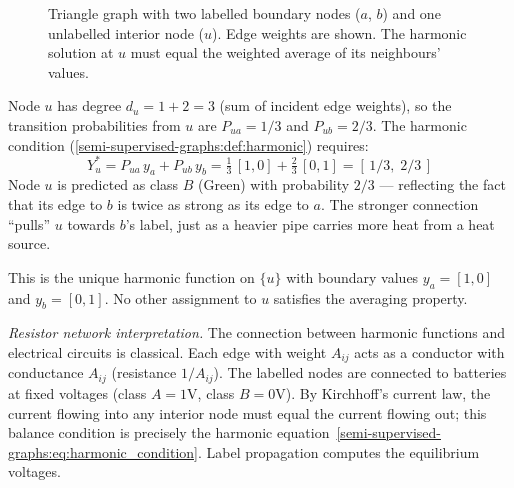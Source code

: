 \begin{notechapter}
\begin{figure}[ht]
\caption{Triangle graph with two labelled boundary nodes ($a$, $b$) and one
  unlabelled interior node ($u$). Edge weights are shown. The harmonic solution
  at $u$ must equal the weighted average of its neighbours' values.}
\label{semi-supervised-graphs:fig:harmonic_triangle}
\end{figure}

Node $u$ has degree $d_u = 1 + 2 = 3$ (sum of incident edge weights), so the
transition probabilities from $u$ are $P_{ua} = 1/3$ and $P_{ub} = 2/3$.
The harmonic condition (\cref{semi-supervised-graphs:def:harmonic}) requires:
\[
Y_u^* = P_{ua}\,y_a + P_{ub}\,y_b
= \tfrac{1}{3}\,[1,0] + \tfrac{2}{3}\,[0,1] = [\,1/3,\; 2/3\,]
\]
Node $u$ is predicted as class $B$ (Green) with probability $2/3$ --- reflecting
the fact that its edge to $b$ is twice as strong as its edge to $a$. The
stronger connection ``pulls'' $u$ towards $b$'s label, just as a heavier pipe
carries more heat from a heat source.

This is the unique harmonic function on $\{u\}$ with boundary values
$y_a = [1,0]$ and $y_b = [0,1]$. No other assignment to $u$ satisfies the
averaging property.

\begin{intuition}
\emph{Resistor network interpretation.} The connection between harmonic
functions and electrical circuits is classical. Each edge with weight $A_{ij}$
acts as a conductor with conductance $A_{ij}$ (resistance $1/A_{ij}$). The
labelled nodes are connected to batteries at fixed voltages (class
$A = 1\text{V}$, class $B = 0\text{V}$). By Kirchhoff's current law, the
current flowing into any interior node must equal the current flowing out;
this balance condition is precisely the harmonic
equation~\eqref{semi-supervised-graphs:eq:harmonic_condition}. Label propagation computes the
equilibrium voltages.


\end{intuition}
\end{notechapter}
